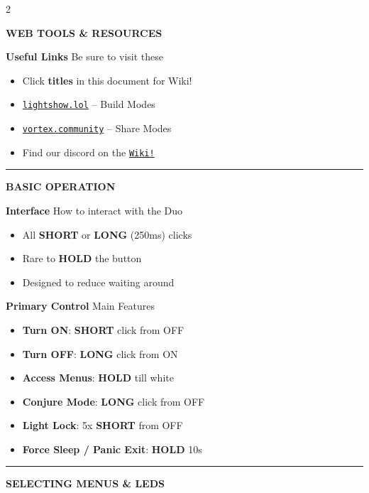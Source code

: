 \documentclass[9pt,a5paper]{article}
\newcommand{\tsection}[1]{\vspace{4pt}\noindent\textbf{\color{twhite}\large #1}\vspace{2pt}}
\newcommand{\desc}[1]{\textcolor{tgray}{#1}}
\newcommand{\sectiondivider}{\vspace{2mm}\noindent\textcolor{sectionline}{\rule{\linewidth}{0.5pt}}\vspace{0mm}}
\newcommand{\sectiontitle}[1]{\vspace{1mm}\noindent\textbf{\color{purple}\large #1}\vspace{0.5mm}}
\begin{document}
\begin{multicols}{2}

\sectiontitle{WEB TOOLS \& RESOURCES}

\tsection{Useful Links}
\desc{Be sure to visit these}
\begin{itemize}
    \item Click \textbf{titles} in this document for Wiki!
    \item \href{https://lightshow.lol}{\texttt{lightshow.lol}} -- Build Modes
    \item \href{https://vortex.community}{\texttt{vortex.community}} -- Share Modes
    \item Find our discord on the \href{https://stoneorbits.github.io/VortexEngine/support.html}{\texttt{Wiki!}}
\end{itemize}

\sectiondivider

\sectiontitle{BASIC OPERATION}

\tsection{Interface}
\desc{How to interact with the Duo}
\begin{itemize}
    \item All \textbf{SHORT} or \textbf{LONG} (250ms) clicks
    \item Rare to \textbf{HOLD} the button
    \item Designed to reduce waiting around
\end{itemize}
\vspace{3pt}

\tsection{Primary Control}
\desc{Main Features}
\begin{itemize}
  \item \textbf{Turn ON}: \textbf{SHORT} click from OFF
  \item \textbf{Turn OFF}: \textbf{LONG} click from ON
  \item \textbf{Access Menus}: \textbf{HOLD} till white
  \item \textbf{Conjure Mode}: \textbf{LONG} click from OFF
  \item \textbf{Light Lock}: 5x \textbf{SHORT} from OFF
  \item \textbf{Force Sleep / Panic Exit}: \textbf{HOLD} 10s
\end{itemize}

\sectiondivider

\sectiontitle{SELECTING MENUS \& LEDS}


\end{multicols}
\end{document}
